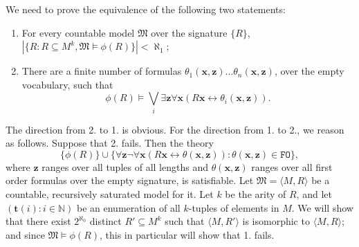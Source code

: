 \documentclass{article}
\theoremstyle{definition}
\newcommand{\tuple}{\mathbf}
\newcommand{\FO}{\texttt{FO}}
\newcommand{\M}{\mathfrak M}
\begin{document}
	We need to prove the equivalence of the following two statements: 
	\begin{enumerate}
		\item For every countable model $\M$ over the signature $\{R\}$, $|\{R : R \subseteq M^k, \M \models \phi(R)\}| < \aleph_1$; 
		\item There are a finite number of formulas $\theta_1(\tuple x, \tuple z) \ldots \theta_n(\tuple x, \tuple z)$, over the empty vocabulary, such that 
			\begin{equation}
				\phi(R) \models \bigvee_i \exists \tuple z \forall \tuple x (R \tuple x \leftrightarrow \theta_i(\tuple x, \tuple z)).
				\label{eq:def}
			\end{equation}
	\end{enumerate}

	The direction from 2. to 1. is obvious. For the direction from 1. to 2., we reason as follows. Suppose that 2. fails. Then the theory
	\begin{equation}
		\{\phi(R)\} \cup \{\forall \tuple z \lnot \forall \tuple x(R \tuple x \leftrightarrow \theta(\tuple x, \tuple z)) : \theta(\tuple x, \tuple z) \in \FO\},
		\label{eq:undef}
	\end{equation}
	where $\tuple z$ ranges over all tuples of all lengths and $\theta(\tuple x, \tuple z)$ ranges over all first order formulas over the empty signature, is satisfiable. Let $\M = \langle M, R\rangle$ be a countable, recursively saturated model for it. Let $k$ be the arity of $R$, and let $(\tuple t(i) : i \in \mathbb N)$ be an enumeration of all $k$-tuples of elements in $M$. We will show that there exist $2^{\aleph_0}$ distinct $R' \subseteq M^k$ such that $\langle M, R'\rangle$ is isomorphic to $\langle M, R\rangle$; and since $\M \models \phi(R)$, this in particular will show that 1. fails. 
\end{document}
